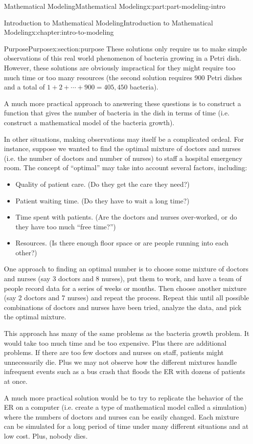 \documentclass[oneside,10pt,]{book}
\numberwithin{equation}{section}
\begin{document}
\begin{partptx}{Mathematical Modeling}{}{Mathematical Modeling}{}{}{x:part:part-modeling-intro}
\begin{chapterptx}{Introduction to Mathematical Modeling}{}{Introduction to Mathematical Modeling}{}{}{x:chapter:intro-to-modeling}
\begin{sectionptx}{Purpose}{}{Purpose}{}{}{x:section:purpose}
These solutions only require us to make simple observations of this real world phenomenon of bacteria growing in a Petri dish. However, these solutions are obviously impractical for they might require too much time or too many resources (the second solution requires 900 Petri dishes and a total of \(1 + 2 + \cdots + 900 = 405,450\) bacteria).%
\par
A much more practical approach to answering these questions is to construct a function that gives the number of bacteria in the dish in terms of time (i.e. construct a mathematical model of the bacteria growth).%
\par
In other situations, making observations may itself be a complicated ordeal. For instance, suppose we wanted to find the optimal mixture of doctors and nurses (i.e. the number of doctors and number of nurses) to staff a hospital emergency room. The concept of “optimal” may take into account several factors, including:%
%
\begin{itemize}[label=\textbullet]
\item{}Quality of patient care. (Do they get the care they need?)%
\item{}Patient waiting time. (Do they have to wait a long time?)%
\item{}Time spent with patients. (Are the doctors and nurses over-worked, or do they have too much “free time?”)%
\item{}Resources. (Is there enough floor space or are people running into each other?)%
\end{itemize}
One approach to finding an optimal number is to choose some mixture of doctors and nurses (say 3 doctors and 8 nurses), put them to work, and have a team of people record data for a series of weeks or months. Then choose another mixture (say 2 doctors and 7 nurses) and repeat the process. Repeat this until all possible combinations of doctors and nurses have been tried, analyze the data, and pick the optimal mixture.%
\par
This approach has many of the same problems as the bacteria growth problem. It would take too much time and be too expensive. Plus there are additional problems. If there are too few doctors and nurses on staff, patients might unnecessarily die. Plus we may not observe how the different mixtures handle infrequent events such as a bus crash that floods the ER with dozens of patients at once.%
\par
A much more practical solution would be to try to replicate the behavior of the ER on a computer (i.e. create a type of mathematical model called a simulation) where the numbers of doctors and nurses can be easily changed. Each mixture can be simulated for a long period of time under many different situations and at low cost. Plus, nobody dies.%

\end{sectionptx}
\end{chapterptx}
\end{partptx}
\end{document}
